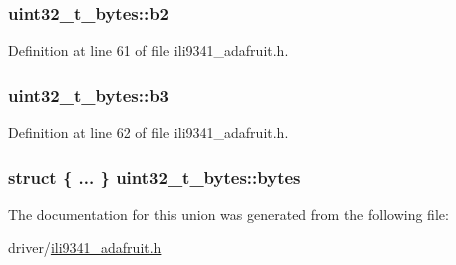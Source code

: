 \subsubsection[{\texorpdfstring{b2}{b2}}]{ uint32\+\_\+t\+\_\+bytes\+::b2}\hypertarget{unionuint32__t__bytes_a462312b99de0c6d1c497064902196e1d}{}\label{unionuint32__t__bytes_a462312b99de0c6d1c497064902196e1d}


Definition at line 61 of file ili9341\+\_\+adafruit.\+h.

\subsubsection[{\texorpdfstring{b3}{b3}}]{ uint32\+\_\+t\+\_\+bytes\+::b3}\hypertarget{unionuint32__t__bytes_abd7739cae59fab7cf712d53f337b378a}{}\label{unionuint32__t__bytes_abd7739cae59fab7cf712d53f337b378a}


Definition at line 62 of file ili9341\+\_\+adafruit.\+h.

\subsubsection[{\texorpdfstring{bytes}{bytes}}]{\setlength{\rightskip}{0pt plus 5cm}struct \{ ... \}   uint32\+\_\+t\+\_\+bytes\+::bytes}\hypertarget{unionuint32__t__bytes_a50aeebe398ee3b740421f1cc8d8583b8}{}\label{unionuint32__t__bytes_a50aeebe398ee3b740421f1cc8d8583b8}


The documentation for this union was generated from the following file\+:\begin{DoxyCompactItemize}
\item 
driver/\hyperlink{ili9341__adafruit_8h}{ili9341\+\_\+adafruit.\+h}\end{DoxyCompactItemize}
